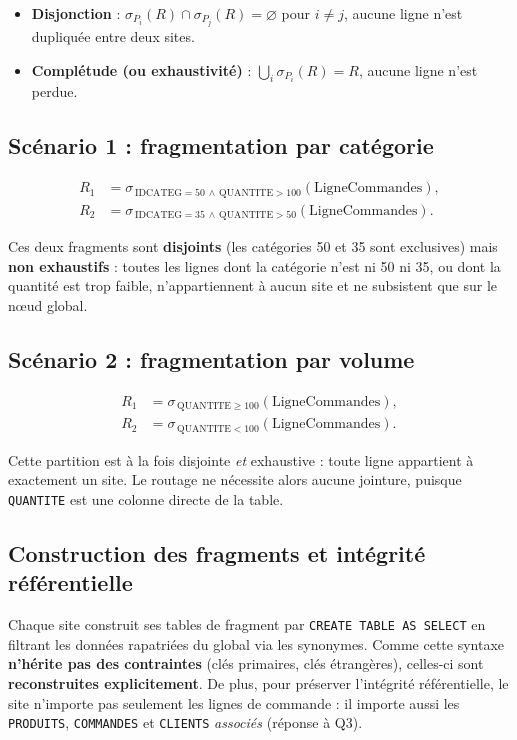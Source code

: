 \documentclass[11pt,a4paper]{article}
\begin{document}
\begin{itemize}[leftmargin=1.4cm]
  \item \textbf{Disjonction} : $\sigma_{P_i}(R) \cap \sigma_{P_j}(R) =
    \varnothing$ pour $i \neq j$, aucune ligne n'est dupliquée entre deux
    sites.
  \item \textbf{Complétude (ou exhaustivité)} : $\bigcup_i \sigma_{P_i}(R) = R$,
    aucune ligne n'est perdue.
\end{itemize}

\subsection{Scénario 1 : fragmentation par catégorie}

\begin{align*}
R_1 &= \sigma_{\,\text{IDCATEG}=50 \,\wedge\, \text{QUANTITE}>100}(\text{LigneCommandes}), \\
R_2 &= \sigma_{\,\text{IDCATEG}=35 \,\wedge\, \text{QUANTITE}>50}(\text{LigneCommandes}).
\end{align*}

Ces deux fragments sont \textbf{disjoints} (les catégories 50 et 35 sont
exclusives) mais \textbf{non exhaustifs} : toutes les lignes dont la catégorie
n'est ni 50 ni 35, ou dont la quantité est trop faible, n'appartiennent à aucun
site et ne subsistent que sur le nœud global.

\subsection{Scénario 2 : fragmentation par volume}

\begin{align*}
R_1 &= \sigma_{\,\text{QUANTITE} \geq 100}(\text{LigneCommandes}), \\
R_2 &= \sigma_{\,\text{QUANTITE} < 100}(\text{LigneCommandes}).
\end{align*}

Cette partition est à la fois disjointe \emph{et} exhaustive : toute ligne
appartient à exactement un site. Le routage ne nécessite alors aucune jointure,
puisque \texttt{QUANTITE} est une colonne directe de la table.

\subsection{Construction des fragments et intégrité référentielle}

Chaque site construit ses tables de fragment par \texttt{CREATE TABLE AS
SELECT} en filtrant les données rapatriées du global via les synonymes. Comme
cette syntaxe \textbf{n'hérite pas des contraintes} (clés primaires, clés
étrangères), celles-ci sont \textbf{reconstruites explicitement}. De plus, pour
préserver l'intégrité référentielle, le site n'importe pas seulement les lignes
de commande : il importe aussi les \texttt{PRODUITS}, \texttt{COMMANDES} et
\texttt{CLIENTS} \emph{associés} (réponse à Q3).
\end{document}

